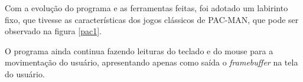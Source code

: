 Com a evolução do programa e as ferramentas feitas, foi adotado um labirinto fixo, que tivesse as características dos jogos clássicos de PAC-MAN, que pode ser observado na figura \ref{pac1}.


O programa ainda continua fazendo leituras do teclado e do mouse para a movimentação do usuário, apresentando apenas como saída o \textit{framebuffer} na tela do usuário.





